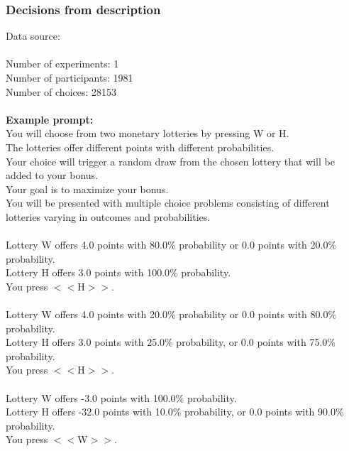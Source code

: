 \documentclass[pdflatex,sn-nature]{sn-jnl}%
\theoremstyle{thmstyleone}%
\theoremstyle{thmstyletwo}%
\theoremstyle{thmstylethree}%
\begin{document}
\subsubsection*{Decisions from description}
Data source: \cite{wulff2018meta} \\ $~$ \\ 
Number of experiments: 1 $~$\\ 
Number of participants: 1981 $~$\\ 
Number of choices: 28153 $~$\\ 
 $~$\\ 
\textbf{Example prompt:}
 $~$\\ 
You will choose from two monetary lotteries by pressing W or H. $~$\\ 
The lotteries offer different points with different probabilities. $~$\\ 
Your choice will trigger a random draw from the chosen lottery that will be added to your bonus. $~$\\ 
Your goal is to maximize your bonus. $~$\\ 
You will be presented with multiple choice problems consisting of different lotteries varying in outcomes and probabilities. $~$\\ 
 $~$\\ 
Lottery W offers 4.0 points with 80.0\% probability or 0.0 points with 20.0\% probability. $~$\\ 
Lottery H offers 3.0 points with 100.0\% probability. $~$\\ 
You press $<<$H$>>$. $~$\\ 
 $~$\\ 
Lottery W offers 4.0 points with 20.0\% probability or 0.0 points with 80.0\% probability. $~$\\ 
Lottery H offers 3.0 points with 25.0\% probability, or 0.0 points with 75.0\% probability. $~$\\ 
You press $<<$H$>>$. $~$\\ 
 $~$\\ 
Lottery W offers -3.0 points with 100.0\% probability. $~$\\ 
Lottery H offers -32.0 points with 10.0\% probability, or 0.0 points with 90.0\% probability. $~$\\ 
You press $<<$W$>>$. 
\end{document}
